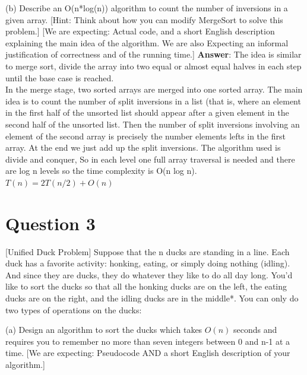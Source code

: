 \documentclass{article}
\begin{document}
\begin{flushleft}
(b) Describe an O(n*log(n)) algorithm to count the number of inversions in a given array.
[Hint: Think about how you can modify MergeSort to solve this problem.]
[We are expecting: Actual code, and a short English description explaining the main idea
of the algorithm. We are also Expecting an informal justification of correctness and of the
running time.]
\linebreak 
\textbf{Answer}: The idea is similar to merge sort, divide the array into two equal or almost equal halves in each step until the base case is reached.\\
In the merge stage, two sorted arrays are merged into one sorted array. The main idea is to count the number of split inversions in a list (that is, where an element in the first half of the unsorted list should appear after a given element in the second half of the unsorted list. Then the number of split inversions involving an element  of the second array is precisely the number elements lefts in the first array. At the end we just add up the split inversions.
The algorithm used is divide and conquer, So in each level one full array traversal is needed and there are log n levels so the time complexity is O(n log n).\\
\textbf{$T(n) = 2T(n/2) + O(n)$}


\section*{Question 3} [Unified Duck Problem] Suppose that the n ducks are standing in a line. Each duck has
a favorite activity: honking, eating, or simply doing nothing (idling). And since they are
ducks, they do whatever they like to do all day long. You’d like to sort the ducks so that
all the honking ducks are on the left, the eating ducks are on the right, and the idling ducks
are in the middle*. You can only do two types of operations on the ducks:
\linebreak 

(a) Design an algorithm to sort the ducks which takes $O(n)  $ seconds and requires you to remember no more than seven integers between 0 and n-1	at a time.
[We are expecting: Pseudocode AND a short English description of your algorithm.]\\


\end{flushleft}
\end{document}

